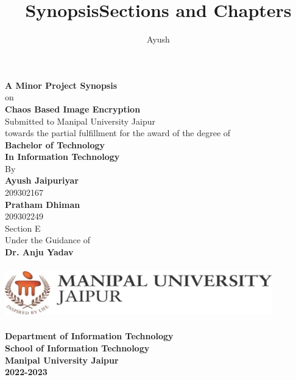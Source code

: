 \documentclass[11pt,a4paper,english]{article}
\author{Ayush}
\begin{document}
\title{Synopsis}
\begin{titlepage}
    \begin{center}
        \LARGE
        \textbf{A Minor Project Synopsis}\\
        on\\
        \Huge
        \textbf{Chaos Based Image Encryption}\\
        \vspace{0.5cm}
        \Large
        Submitted to Manipal University Jaipur\\
        towards the partial fulfillment for the award of the degree of\\
        \vspace{0.5cm}
        \LARGE
        \textbf{Bachelor of Technology}\\
        \textbf{In Information Technology}\\
        \vspace{0.5cm}
        \large
        By\\
        \Large
        \textbf{Ayush Jaipuriyar}\\
        209302167\\
        \textbf{Pratham Dhiman}\\
        209302249\\
        Section E\\
        \vspace{0.5cm}
        \large
        Under the Guidance of\\
        \Large
        \textbf{Dr. Anju Yadav }

        \vfill

        \includegraphics[width=11.58cm,height=2.28cm]{logo}

        \LARGE
        \textbf{Department of Information Technology}\\
        \textbf{School of Information Technology }\\
        \textbf{Manipal University Jaipur}\\
        \Large
        \textbf{2022-2023}

    \end{center}
\end{titlepage}
\newpage
\title{Sections and Chapters}
\date{}
\maketitle
\tableofcontents
\newpage
\end{document}
